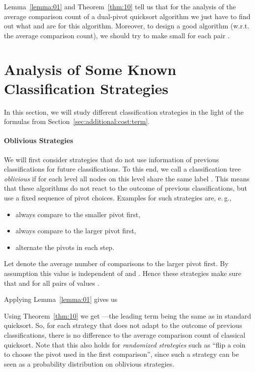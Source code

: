 \documentclass[prodmode,acmtalg]{acmsmall}
\begin{document}
Lemma~\ref{lemma:01} and Theorem~\ref{thm:10} tell us that for the analysis of the 
average comparison count of a dual-pivot quicksort algorithm we just have to find out what 
 and  are for
this algorithm. Moreover, to design a good algorithm (w.r.t. the average
comparison count), we should try to make  small for each pair . 

\section{Analysis of Some Known Classification Strategies}\label{sec:methods}
In this section, we will study different classification strategies in the light
of the formulas from
Section~\ref{sec:additional:cost:term}.  

\paragraph{Oblivious Strategies}
We will first consider strategies that do not use information of previous
classifications for future classifications. To this end, we call a classification tree
\emph{oblivious} if for each level all nodes  on this level share the same
label . 
This means that
these algorithms do not react
to the outcome of previous classifications, but use a fixed sequence of pivot
choices.
Examples for
such strategies are, e.\,g., 
\begin{itemize}
    \item always compare to the smaller pivot first, 
    \item always
compare to the larger pivot first,
    \item alternate the pivots in each step.
\end{itemize}
Let  denote the average number of comparisons to the larger pivot
first. By assumption this value is independent of  and . Hence these
strategies make sure that  and
 for all pairs of values .

Applying Lemma~\ref{lemma:01} gives us 

Using Theorem~\ref{thm:10} we get ---the leading term being the same as in standard quicksort. 
So, for each strategy that does not adapt to the outcome of previous
classifications, there is no difference to the average
comparison count of classical quicksort. Note that this also holds for
\emph{randomized strategies} such as ``flip a coin to choose the pivot used in the
first comparison'', since such a strategy can be seen as a probability
distribution on oblivious strategies.
\end{document}
